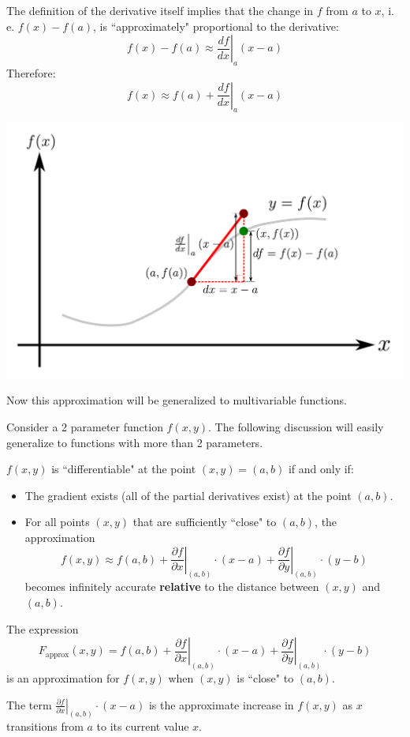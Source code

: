 \documentclass{article}
\begin{document}
The definition of the derivative itself implies that the change in \(f\) from \(a\) to \(x\), i. e. \(f(x) - f(a)\), is ``approximately" proportional to the derivative:
\[f(x) - f(a) \approx \left.\frac{df}{dx}\right|_a (x - a)\]
Therefore:
\[f(x) \approx f(a) + \left.\frac{df}{dx}\right|_a (x - a)\]

\includegraphics[width = \textwidth]{single_variable_differentiability}

Now this approximation will be generalized to multivariable functions. 

Consider a 2 parameter function \(f(x, y)\). The following discussion will easily generalize to functions with more than 2 parameters.

\(f(x, y)\) is ``differentiable" at the point \((x, y) = (a, b)\) if and only if: 
\begin{itemize}
\item The gradient exists (all of the partial derivatives exist) at the point \((a, b)\).
\item For all points \((x, y)\) that are sufficiently ``close" to \((a, b)\), the approximation 
\[f(x, y) \approx f(a, b) + \left.\frac{\partial f}{\partial x}\right|_{(a, b)} \cdot (x - a) + \left.\frac{\partial f}{\partial y}\right|_{(a,b)} \cdot (y - b)\]
becomes infinitely accurate {\bf relative} to the distance between \((x, y)\) and \((a, b)\).
\end{itemize}
The expression 
\[F_{\text{approx}}(x, y) = f(a, b) + \left.\frac{\partial f}{\partial x}\right|_{(a,b)} \cdot (x - a) + \left.\frac{\partial f}{\partial y}\right|_{(a,b)} \cdot (y - b)\] 
is an approximation for \(f(x, y)\) when \((x, y)\) is ``close" to \((a, b)\).

The term \(\left.\frac{\partial f}{\partial x}\right|_{(a, b)} \cdot (x - a)\) is the approximate increase in \(f(x, y)\) as \(x\) transitions from \(a\) to its current value \(x\).  
\end{document}

